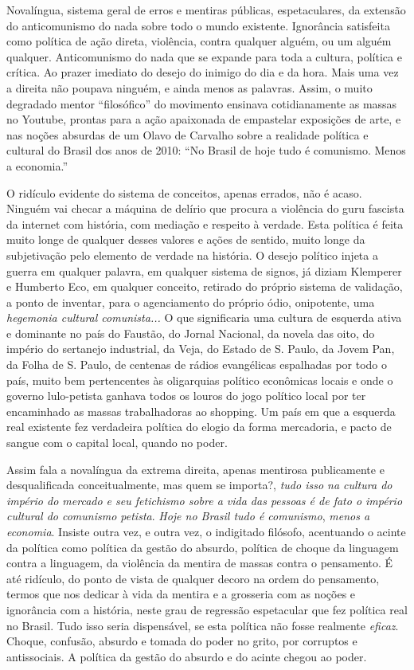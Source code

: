 Novalíngua, sistema geral de erros e mentiras públicas, espetaculares,
da extensão do anticomunismo do nada sobre todo o mundo existente.
Ignorância satisfeita como política de ação direta, violência, contra
qualquer alguém, ou um alguém qualquer. Anticomunismo do nada que se
expande para toda a cultura, política e crítica. Ao prazer imediato do
desejo do inimigo do dia e da hora. Mais uma vez a direita não poupava
ninguém, e ainda menos as palavras. Assim, o muito degradado mentor
``filosófico'' do movimento ensinava cotidianamente as massas no
Youtube, prontas para a ação apaixonada de empastelar exposições de
arte, e nas noções absurdas de um Olavo de Carvalho sobre a realidade
política e cultural do Brasil dos anos de 2010: ``No Brasil de hoje tudo
é comunismo. Menos a economia.''

O ridículo evidente do sistema de conceitos, apenas errados, não é
acaso. Ninguém vai checar a máquina de delírio que procura a violência
do guru fascista da internet com história, com mediação e respeito à
verdade. Esta política é feita muito longe de qualquer desses valores e
ações de sentido, muito longe da subjetivação pelo elemento de verdade
na história. O desejo político injeta a guerra em qualquer palavra, em
qualquer sistema de signos, já diziam Klemperer e Humberto Eco, em
qualquer conceito, retirado do próprio sistema de validação, a ponto de
inventar, para o agenciamento do próprio ódio, onipotente, uma
\emph{hegemonia cultural comunista...} O que significaria uma cultura de
esquerda ativa e dominante no país do Faustão, do Jornal Nacional, da
novela das oito, do império do sertanejo industrial, da Veja, do Estado
de S. Paulo, da Jovem Pan, da Folha de S. Paulo, de centenas de rádios
evangélicas espalhadas por todo o país, muito bem pertencentes às
oligarquias político econômicas locais e onde o governo lulo-petista
ganhava todos os louros do jogo político local por ter encaminhado as
massas trabalhadoras ao shopping. Um país em que a esquerda real
existente fez verdadeira política do elogio da forma mercadoria, e pacto
de sangue com o capital local, quando no poder.

Assim fala a novalíngua da extrema direita, apenas mentirosa
publicamente e desqualificada conceitualmente, mas quem se importa?,
\emph{tudo isso na cultura do império do mercado e seu fetichismo sobre
a vida das pessoas é de fato o império cultural do comunismo petista}.
\emph{Hoje no Brasil tudo é comunismo}, \emph{menos a economia}. Insiste
outra vez, e outra vez, o indigitado filósofo, acentuando o acinte da
política como política da gestão do absurdo, política de choque da
linguagem contra a linguagem, da violência da mentira de massas contra o
pensamento. É até ridículo, do ponto de vista de qualquer decoro na
ordem do pensamento, termos que nos dedicar à vida da mentira e a
grosseria com as noções e ignorância com a história, neste grau de
regressão espetacular que fez política real no Brasil. Tudo isso seria
dispensável, se esta política não fosse realmente \emph{eficaz}. Choque,
confusão, absurdo e tomada do poder no grito, por corruptos e
antissociais. A política da gestão do absurdo e do acinte chegou ao
poder.

